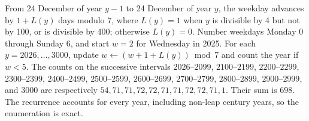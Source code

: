 From 24 December of year $y-1$ to 24 December of year $y$, the weekday advances by $1+L(y)$ days modulo 7, where $L(y)=1$ when $y$ is divisible by 4 but not by 100, or is divisible by 400; otherwise $L(y)=0$. Number weekdays Monday 0 through Sunday 6, and start $w=2$ for Wednesday in 2025. For each $y=2026,\ldots,3000$, update $w\leftarrow(w+1+L(y))\bmod7$ and count the year if $w<5$. The counts on the successive intervals $2026$--$2099$, $2100$--$2199$, $2200$--$2299$, $2300$--$2399$, $2400$--$2499$, $2500$--$2599$, $2600$--$2699$, $2700$--$2799$, $2800$--$2899$, $2900$--$2999$, and $3000$ are respectively $54,71,71,72,72,71,71,72,72,71,1$. Their sum is $\boxed{698}$. The recurrence accounts for every year, including non-leap century years, so the enumeration is exact.
